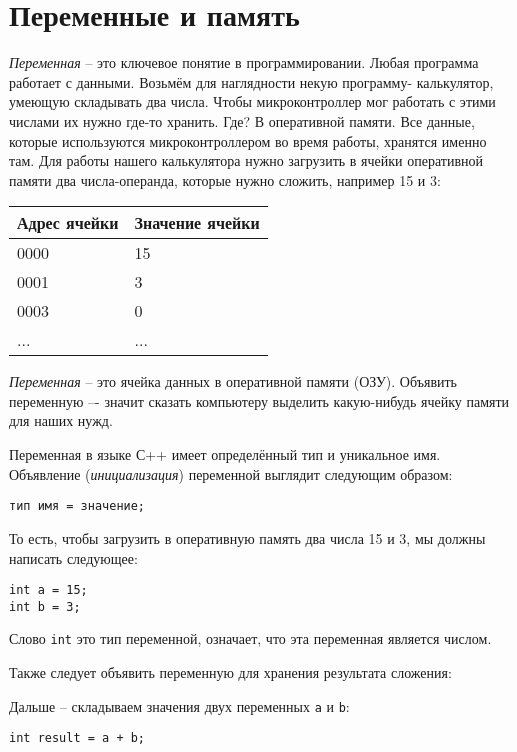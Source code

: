 \documentclass[../sparc.tex]{subfiles}
\begin{document}
\section{Переменные и память}

\emph{Переменная} -- это ключевое понятие в программировании. Любая программа
работает с данными. Возьмём для наглядности некую программу- калькулятор,
умеющую складывать два числа. Чтобы микроконтроллер мог работать с этими числами
их нужно где-то хранить. Где? В оперативной памяти. Все данные, которые
используются микроконтроллером во время работы, хранятся именно там. Для работы
нашего калькулятора нужно загрузить в ячейки оперативной памяти два
числа-операнда, которые нужно сложить, например 15 и 3:

\begin{tabular}{p{4cm}|p{6cm}}
  Адрес ячейки & Значение ячейки \\
  \hline \hline
  0000 & 15 \\
  \hline
  0001 & 3 \\
  \hline
  0003 & 0 \\
  ... & ... \\
\end{tabular}

\emph{Переменная} -- это ячейка данных в оперативной памяти (ОЗУ). Объявить
переменную –- значит сказать компьютеру выделить какую-нибудь ячейку памяти для
наших нужд.

Переменная в языке С++ имеет определённый тип и уникальное имя. Объявление
(\emph{инициализация}) переменной выглядит следующим образом:

\begin{verbatim}
тип имя = значение;
\end{verbatim}

То есть, чтобы загрузить в оперативную память два числа 15 и 3, мы должны написать
следующее:

\begin{verbatim}
int a = 15;
int b = 3;
\end{verbatim}

Слово \texttt{int} это тип переменной, означает, что эта переменная является
числом.

Также следует объявить переменную для хранения результата сложения:

Дальше -- складываем значения двух переменных \texttt{a} и \texttt{b}:

\begin{verbatim}
int result = a + b;
\end{verbatim}
\end{document}
